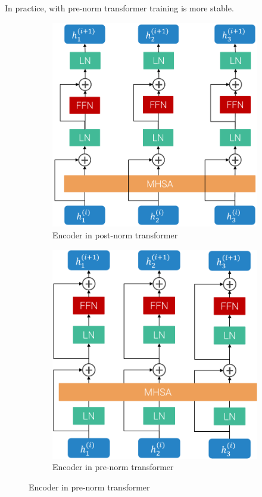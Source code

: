 \begin{description}
\begin{descriptionlist}
                \begin{remark}
                    In practice, with pre-norm transformer training is more stable.
                \end{remark}
        \end{descriptionlist}

        \begin{figure}[H]
            \centering
            \begin{subfigure}{0.40\linewidth}
                \centering
                \includegraphics[width=0.8\linewidth]{./img/_post_norm_encoder.pdf}
                \caption{Encoder in post-norm transformer}
            \end{subfigure}
            \begin{subfigure}{0.40\linewidth}
                \centering
                \includegraphics[width=0.8\linewidth]{./img/_pre_norm_encoder.pdf}
                \caption{Encoder in pre-norm transformer}
            \end{subfigure}
        \end{figure}


\end{description}
